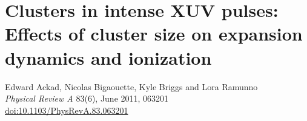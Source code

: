 
\newcommand{\PaperTitleSize}{Clusters in intense XUV pulses: Effects of cluster size on expansion
                             dynamics and ionization}

\section{\PaperTitleSize}
\label{section:papers:size}

\begin{flushright}
Edward Ackad, Nicolas Bigaouette, Kyle Briggs and Lora Ramunno\\
\textit{Physical Review A} 83(6), June 2011, 063201\\
\href{http://dx.doi.org/10.1103/PhysRevA.83.063201}{doi:10.1103/PhysRevA.83.063201}
\end{flushright}


\HidePDFAbstractNumber


